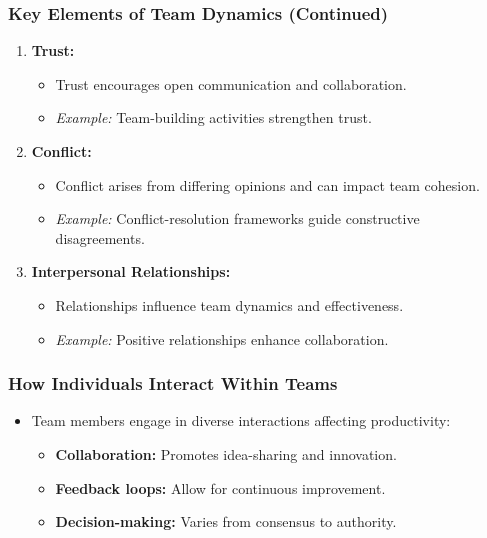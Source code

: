 \documentclass[aspectratio=169]{beamer}
\begin{document}
\begin{frame}[fragile]
    \frametitle{Key Elements of Team Dynamics (Continued)}
    \begin{enumerate}[resume]
        \item \textbf{Trust:}
          \begin{itemize}
              \item Trust encourages open communication and collaboration.
              \item \textit{Example:} Team-building activities strengthen trust.
          \end{itemize}

        \item \textbf{Conflict:}
          \begin{itemize}
              \item Conflict arises from differing opinions and can impact team cohesion.
              \item \textit{Example:} Conflict-resolution frameworks guide constructive disagreements.
          \end{itemize}

        \item \textbf{Interpersonal Relationships:}
          \begin{itemize}
              \item Relationships influence team dynamics and effectiveness.
              \item \textit{Example:} Positive relationships enhance collaboration.
          \end{itemize}
    \end{enumerate}
\end{frame}

\begin{frame}[fragile]
    \frametitle{How Individuals Interact Within Teams}
    \begin{itemize}
        \item Team members engage in diverse interactions affecting productivity:
            \begin{itemize}
                \item \textbf{Collaboration:} Promotes idea-sharing and innovation.
                \item \textbf{Feedback loops:} Allow for continuous improvement.
                \item \textbf{Decision-making:} Varies from consensus to authority.
            \end{itemize}
    \end{itemize}
\end{frame}
\end{document}
